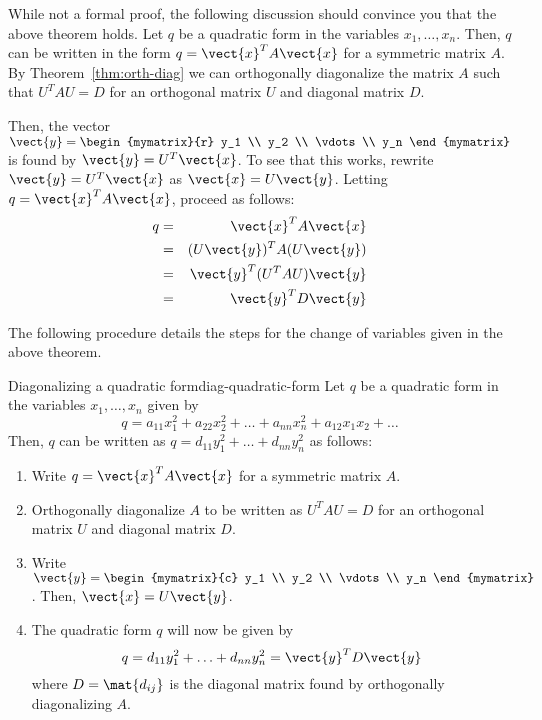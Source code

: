 While not a formal proof, the following discussion should convince you that the above theorem holds. Let $q$ be a quadratic form in the variables $x_1,\ldots, x_n$. Then, $q$ can be written in the form $q = \vect{x}^T A \vect{x}$ for a symmetric matrix $A$.  
By Theorem~\ref{thm:orth-diag} we can orthogonally diagonalize the matrix $A$ such that $U^TAU = D$ for an orthogonal matrix $U$ and diagonal matrix $D$. 

Then, the vector $\vect{y} = \begin{mymatrix}{r}
y_1 \\
y_2 \\
\vdots \\
y_n
\end{mymatrix}
$ is found by $\vect{y} = U^T \vect{x}$. To see that this works, rewrite $\vect{y} = U^T \vect{x}$ as $\vect{x} = U\vect{y}$. Letting $q = \vect{x}^TA\vect{x}$, proceed as follows:
\begin{eqnarray*}
q &=& \vect{x}^T A \vect{x}\\
&=& (U\vect{y})^T A (U\vect{y})\\
&=& \vect{y}^T (U^TAU) \vect{y} \\
&=& \vect{y}^T D \vect{y}
\end{eqnarray*}

The following procedure details the steps for the change of variables given in the above theorem. 

\begin{procedure}{Diagonalizing a quadratic form}{diag-quadratic-form}
Let $q$ be a quadratic form in the variables $x_1,\ldots, x_n$ given by 
\[
q = a_{11}x_1^2 + a_{22}x_2^2 + \ldots + a_{nn}x_n^2 + a_{12}x_1x_2+\ldots
\]
Then, $q$ can be written as $q = d_{11}y_1^2 + \ldots + d_{nn}y_n^2$ as follows:

\begin{enumerate}
\item
Write $q = \vect{x}^T A \vect{x}$ for a symmetric matrix $A$. 

\item
Orthogonally diagonalize $A$ to be written as $U^TAU=D$ for an orthogonal matrix $U$ and diagonal matrix $D$. 

\item
Write $\vect{y} = \begin{mymatrix}{c}
y_1 \\
y_2 \\
\vdots \\
y_n
\end{mymatrix}$. Then, $\vect{x} = U \vect{y}$. 

\item 
The quadratic form $q$ will now be given by 
\[
q = d_{11}y_1^2 + \ldots + d_{nn}y_n^2 = \vect{y}^T D \vect{y}
\]
where $D = \mat{d_{ij} }$ is the diagonal matrix found by orthogonally diagonalizing $A$. 
\end{enumerate}
\end{procedure}

